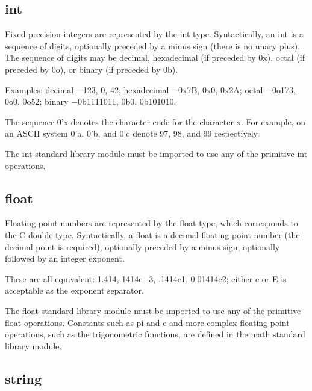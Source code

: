 \documentclass[a4paper,11pt,notitlepage,onecolumn]{book}
\begin{document}
\subsection*{\textsf{int}}

Fixed precision integers are represented by the \textsf{int} type.  Syntactically,
an \textsf{int} is a sequence of digits, optionally preceded by a minus sign (there
is no unary plus).  The sequence of digits may be decimal, hexadecimal (if
preceded by \textsf{0x}), octal (if preceded by \textsf{0o}), or binary (if preceded by
\textsf{0b}).

Examples: decimal \textsf{{\ensuremath{-}}123}, \textsf{0}, \textsf{42}; hexadecimal \textsf{{\ensuremath{-}}0x7B}, \textsf{0x0}, \textsf{0x2A};
octal \textsf{{\ensuremath{-}}0o173}, \textsf{0o0}, \textsf{0o52}; binary \textsf{{\ensuremath{-}}0b1111011}, \textsf{0b0}, \textsf{0b101010}.

The sequence \textsf{0'x} denotes the character code for the character \textsf{x}.  For
example, on an ASCII system \textsf{0'a}, \textsf{0'b}, and \textsf{0'c} denote 97, 98, and 99
respectively.

The \textsf{int} standard library module must be imported to use any of the
primitive \textsf{int} operations.

\subsection*{\textsf{float}}

Floating point numbers are represented by the \textsf{float} type, which
corresponds to the C \textsf{double} type.  Syntactically, a \textsf{float} is a decimal
floating point number (the decimal point is required), optionally preceded
by a minus sign, optionally followed by an integer exponent.

These are all equivalent: \textsf{1.414}, \textsf{1414e{\ensuremath{-}}3}, \textsf{.1414e1}, \textsf{0.01414e2};
either \textsf{e} or \textsf{E} is acceptable as the exponent separator.

The \textsf{float} standard library module must be imported to use any of the
primitive \textsf{float} operations.  Constants such as \textsf{pi} and \textsf{e} and more
complex floating point operations, such as the trigonometric functions, are
defined in the \textsf{math} standard library module.

\subsection*{\textsf{string}}
\end{document}
